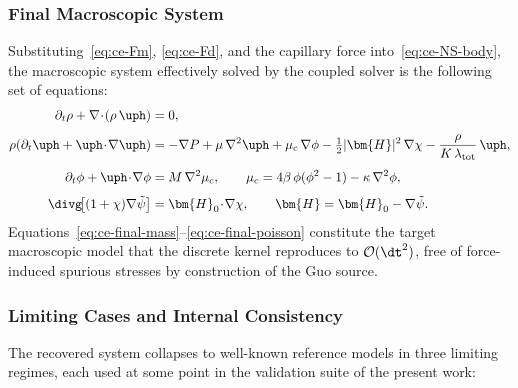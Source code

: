 \subsubsection{Final Macroscopic System}\label{sec:ce-final}

Substituting~\eqref{eq:ce-Fm}, \eqref{eq:ce-Fd}, and the capillary force into~\eqref{eq:ce-NS-body}, the macroscopic system effectively solved by the coupled solver is the following set of equations:
\begin{align}
\partial_t\rho + \nabla\!\cdot\!(\rho\,\uph) &= 0, \label{eq:ce-final-mass}\\[4pt]
\rho\!\left(\partial_t\uph + \uph\!\cdot\!\nabla\uph\right) &= -\nabla P + \mu\,\nabla^{2}\uph + \mu_c\,\nabla\phi - \tfrac{1}{2}|\bm{H}|^{2}\,\nabla\chi - \frac{\rho}{K\,\lambda_{\mathrm{tot}}}\,\uph, \label{eq:ce-final-mom}\\[4pt]
\partial_t\phi + \uph\!\cdot\!\nabla\phi &= M\,\nabla^{2}\mu_c,\qquad \mu_c = 4\beta\,\phi(\phi^{2}-1) - \kappa\,\nabla^{2}\phi, \label{eq:ce-final-ch}\\[4pt]
\divg\!\bigl[(1+\chi)\nabla\tilde{\psi}\bigr] &= \bm{H}_0\!\cdot\!\nabla\chi,\qquad \bm{H} = \bm{H}_0 - \nabla\tilde{\psi}.
\label{eq:ce-final-poisson}
\end{align}
Equations~\eqref{eq:ce-final-mass}--\eqref{eq:ce-final-poisson} constitute the target macroscopic model that the discrete kernel reproduces to $\mathcal{O}(\dt^{2})$, free of force-induced spurious stresses by construction of the Guo source.

\subsubsection{Limiting Cases and Internal Consistency}\label{sec:ce-limits}

The recovered system collapses to well-known reference models in three limiting regimes, each used at some point in the validation suite of the present work:


